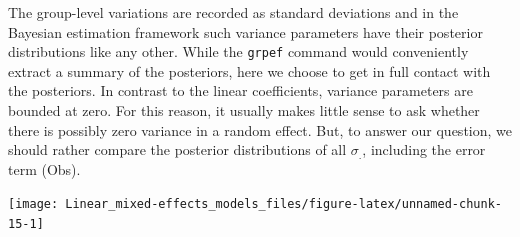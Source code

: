 \documentclass[]{svmono}
\newenvironment{Shaded}{\begin{snugshade}}{\end{snugshade}}
\newcommand{\KeywordTok}[1]{\textcolor[rgb]{0.13,0.29,0.53}{\textbf{#1}}}
\newcommand{\DataTypeTok}[1]{\textcolor[rgb]{0.13,0.29,0.53}{#1}}
\newcommand{\DecValTok}[1]{\textcolor[rgb]{0.00,0.00,0.81}{#1}}
\newcommand{\StringTok}[1]{\textcolor[rgb]{0.31,0.60,0.02}{#1}}
\newcommand{\OperatorTok}[1]{\textcolor[rgb]{0.81,0.36,0.00}{\textbf{#1}}}
\newcommand{\NormalTok}[1]{#1}
\begin{document}
The group-level variations are recorded as standard deviations and in
the Bayesian estimation framework such variance parameters have their
posterior distributions like any other. While the \texttt{grpef} command
would conveniently extract a summary of the posteriors, here we choose
to get in full contact with the posteriors. In contrast to the linear
coefficients, variance parameters are bounded at zero. For this reason,
it usually makes little sense to ask whether there is possibly zero
variance in a random effect. But, to answer our question, we should
rather compare the posterior distributions of all \(\sigma_.\),
including the error term (Obs).

\begin{Shaded}
\end{Shaded}

\texttt{[image: Linear\_mixed-effects\_models\_files/figure-latex/unnamed-chunk-15-1]}
\end{document}
